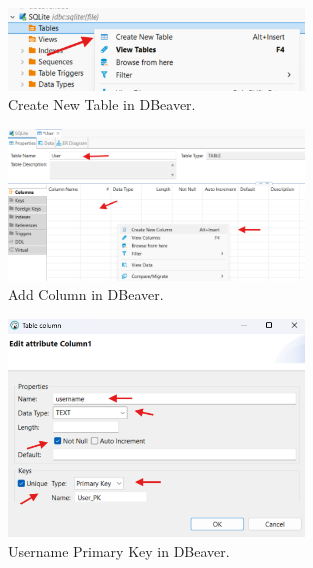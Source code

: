 \documentclass[a4paper,11pt,oneside]{article}
\begin{document}
\begin{sloppypar}
\begin{figure}[!htb]
  \centering
  \includegraphics[width=0.7\textwidth]{dbeaver/create_new_table.png}
  \caption{Create New Table in DBeaver.}
  \label{fig:create_new_table}
\end{figure}

\begin{figure}[!htb]
  \centering
  \includegraphics[width=0.7\textwidth]{dbeaver/name_and_add_column.png}
  \caption{Add Column in DBeaver.}
  \label{fig:name_and_add_column}
\end{figure}

\begin{figure}[!htb]
  \centering
  \includegraphics[width=0.7\textwidth]{dbeaver/username_primary_key.png}
  \caption{Username Primary Key in DBeaver.}
  \label{fig:username_primary_key}
\end{figure}


\end{sloppypar}
\end{document}
